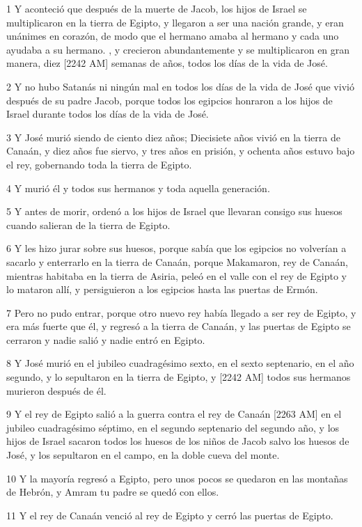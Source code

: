 \par 1 Y aconteció que después de la muerte de Jacob, los hijos de Israel se multiplicaron en la tierra de Egipto, y llegaron a ser una nación grande, y eran unánimes en corazón, de modo que el hermano amaba al hermano y cada uno ayudaba a su hermano. , y crecieron abundantemente y se multiplicaron en gran manera, diez [2242 AM] semanas de años, todos los días de la vida de José.
\par 2 Y no hubo Satanás ni ningún mal en todos los días de la vida de José que vivió después de su padre Jacob, porque todos los egipcios honraron a los hijos de Israel durante todos los días de la vida de José.
\par 3 Y José murió siendo de ciento diez años; Diecisiete años vivió en la tierra de Canaán, y diez años fue siervo, y tres años en prisión, y ochenta años estuvo bajo el rey, gobernando toda la tierra de Egipto.
\par 4 Y murió él y todos sus hermanos y toda aquella generación.
\par 5 Y antes de morir, ordenó a los hijos de Israel que llevaran consigo sus huesos cuando salieran de la tierra de Egipto.
\par 6 Y les hizo jurar sobre sus huesos, porque sabía que los egipcios no volverían a sacarlo y enterrarlo en la tierra de Canaán, porque Makamaron, rey de Canaán, mientras habitaba en la tierra de Asiria, peleó en el valle con el rey de Egipto y lo mataron allí, y persiguieron a los egipcios hasta las puertas de Ermón.
\par 7 Pero no pudo entrar, porque otro nuevo rey había llegado a ser rey de Egipto, y era más fuerte que él, y regresó a la tierra de Canaán, y las puertas de Egipto se cerraron y nadie salió y nadie entró en Egipto.
\par 8 Y José murió en el jubileo cuadragésimo sexto, en el sexto septenario, en el año segundo, y lo sepultaron en la tierra de Egipto, y [2242 AM] todos sus hermanos murieron después de él.
\par 9 Y el rey de Egipto salió a la guerra contra el rey de Canaán [2263 AM] en el jubileo cuadragésimo séptimo, en el segundo septenario del segundo año, y los hijos de Israel sacaron todos los huesos de los niños de Jacob salvo los huesos de José, y los sepultaron en el campo, en la doble cueva del monte.
\par 10 Y la mayoría regresó a Egipto, pero unos pocos se quedaron en las montañas de Hebrón, y Amram tu padre se quedó con ellos.
\par 11 Y el rey de Canaán venció al rey de Egipto y cerró las puertas de Egipto.
